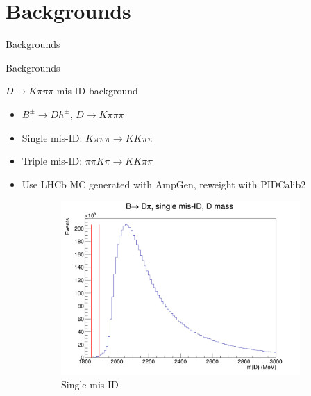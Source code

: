 \documentclass{beamer}
\begin{document}
\section{Backgrounds}
\begin{frame}{Backgrounds}
  \begin{center}
    {\huge Backgrounds}
  \end{center}
\end{frame}

\begin{frame}{$D\to K\pi\pi\pi$ mis-ID background}
  \begin{itemize}
    \setlength\itemsep{0.5em}
    \item{$B^\pm\to Dh^\pm$, $D\to K\pi\pi\pi$}
    \item{Single mis-ID: $K\pi\pi\pi\to KK\pi\pi$}
    \item{Triple mis-ID: $\pi\pi K\pi\to KK\pi\pi$}
    \item{Use LHCb MC generated with AmpGen, reweight with PIDCalib2}
  \end{itemize}
  \begin{figure}
    \centering
    \begin{subfigure}{0.45\textwidth}
      \includegraphics[width = 1.0\textwidth]{Plots/Kpipipi_SingleMisID_Dpi_DMass.png}
      \caption{Single mis-ID}
    \end{subfigure}%
    \begin{subfigure}{0.45\textwidth}

\end{subfigure}
\end{figure}
\end{frame}
\end{document}
